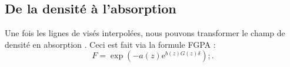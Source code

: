 \documentclass[11pt, twoside, a4paper, openright]{report}
\begin{document}
\subsection{De la densité à l'absorption}
Une fois les lignes de visés interpolées, nous pouvons transformer le champ de densité en absorption \lya{}. Ceci est fait via la formule FGPA :
\begin{equation}
F = \exp( - a(z) \mathrm{e}^{b(z) G(z) \delta}) ;.  
\end{equation}




\end{document}
